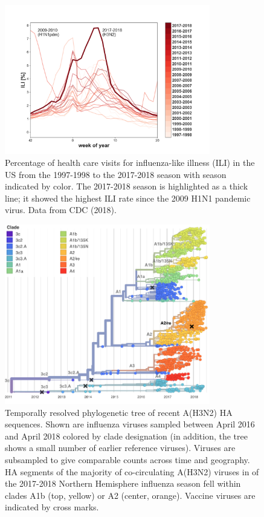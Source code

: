 \begin{figure}[b]
    \begin{center}
    \includegraphics[width=0.8\textwidth]{figures/ili_1997_2018.png}
    \end{center}
    \caption{Percentage of health care visits for influenza-like illness (ILI) in the US from the 1997-1998 to the 2017-2018 season with season indicated by color. The 2017-2018 season is highlighted as a thick line; it showed the highest ILI rate since the 2009 H1N1 pandemic virus. Data from CDC (2018).}
    \label{fig:ili}
\end{figure}

\begin{figure}[b]
    \begin{center}
    \includegraphics[width=0.8\textwidth]{figures/2y_clades.png}
    \end{center}
    \caption{Temporally resolved phylogenetic tree of recent A(H3N2) HA sequences. Shown are influenza viruses sampled between April 2016 and April 2018 colored by clade designation (in addition, the tree shows a small number of earlier reference viruses). Viruses are subsampled to give comparable counts across time and geography. HA segments of the majority of co-circulating A(H3N2) viruses in of the 2017-2018 Northern Hemisphere influenza season fell within clades A1b (top, yellow) or A2 (center, orange). Vaccine viruses are indicated by cross marks. }
    \label{fig:2y_clades}
\end{figure}

